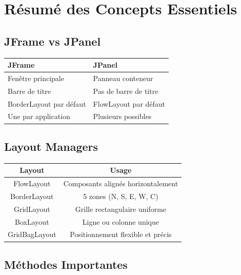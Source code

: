 \documentclass[11pt,a4paper]{article}
\begin{document}
\newpage

\section{Résumé des Concepts Essentiels}

\subsection{JFrame vs JPanel}

\begin{table}[h]
\centering
\begin{tabular}{|p{7cm}|p{7cm}|}
\hline
\textbf{JFrame} & \textbf{JPanel} \\
\hline
Fenêtre principale & Panneau conteneur \\
\hline
Barre de titre & Pas de barre de titre \\
\hline
BorderLayout par défaut & FlowLayout par défaut \\
\hline
Une par application & Plusieurs possibles \\
\hline
\end{tabular}
\end{table}

\subsection{Layout Managers}

\begin{table}[h]
\centering
\begin{tabular}{|c|c|}
\hline
\textbf{Layout} & \textbf{Usage} \\
\hline
FlowLayout & Composants alignés horizontalement \\
\hline
BorderLayout & 5 zones (N, S, E, W, C) \\
\hline
GridLayout & Grille rectangulaire uniforme \\
\hline
BoxLayout & Ligne ou colonne unique \\
\hline
GridBagLayout & Positionnement flexible et précis \\
\hline
\end{tabular}
\end{table}

\subsection{Méthodes Importantes}
\end{document}
